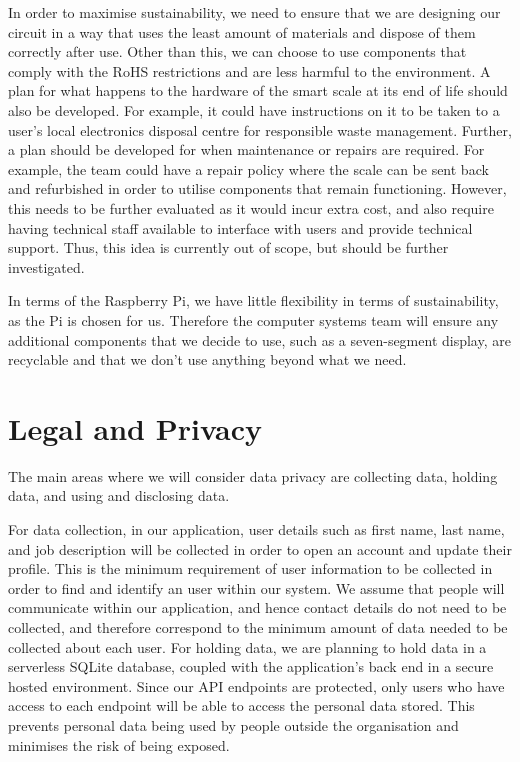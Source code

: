 In order to maximise sustainability, we need to ensure that we are designing our circuit in a way that uses the least amount of materials and dispose of them correctly after use. Other than this, we can choose to use components that comply with the RoHS restrictions and are less harmful to the environment. A plan for what happens to the hardware of the smart scale at its end of life should also be developed. For example, it could have instructions on it to be taken to a user’s local electronics disposal centre for responsible waste management. Further, a plan should be developed for when maintenance or repairs are required. For example, the team could have a repair policy where the scale can be sent back and refurbished in order to utilise components that remain functioning. However, this needs to be further evaluated as it would incur extra cost, and also require having technical staff available to interface with users and provide technical support. Thus, this idea is currently out of scope, but should be further investigated.

In terms of the Raspberry Pi, we have little flexibility in terms of sustainability, as the Pi is chosen for us. Therefore the computer systems team will ensure any additional components that we decide to use, such as a seven-segment display, are recyclable and that we don’t use anything beyond what we need. 


\section{Legal and Privacy}

The main areas where we will consider data privacy are collecting data, holding data, and using and disclosing data.

For data collection, in our application, user details such as first name, last name, and job description will be collected in order to open an account and update their profile. This is the minimum requirement of user information to be collected in order to find and identify an user within our system. We assume that people will communicate within our application, and hence contact details do not need to be collected, and therefore correspond to the minimum amount of data needed to be collected about each user.
For holding data, we are planning to hold data in a serverless SQLite database, coupled with the application's back end in a secure hosted environment. Since our API endpoints are protected, only users who have access to each endpoint will be able to access the personal data stored. This prevents personal data being used by people outside the organisation and minimises the risk of being exposed.

